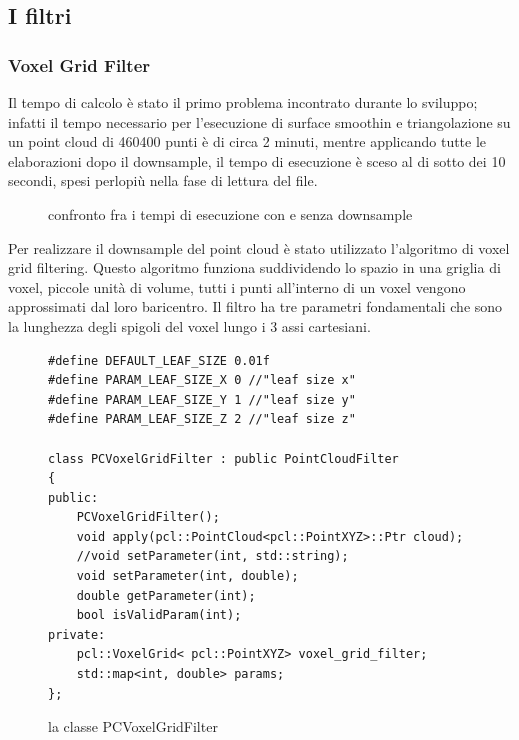 \documentclass[a4paper,12pt]{article}
\begin{document}
	\subsection{I filtri}
		\subsubsection{Voxel Grid Filter}
		Il tempo di calcolo è stato il primo problema incontrato durante lo sviluppo; infatti
		il tempo necessario per l'esecuzione di surface smoothin e triangolazione su un point cloud di 460400 punti è
		di circa 2 minuti, mentre applicando tutte le elaborazioni dopo il downsample,
		il tempo di esecuzione è sceso al di sotto dei 10 secondi, spesi perlopiù nella fase di lettura del file.
		\begin{figure}[H]
    	\centering
    	\caption{confronto fra i tempi di esecuzione con e senza downsample}
    	\label{fig:time_comparison}
		\end{figure}		
		Per realizzare il downsample del point cloud è stato utilizzato l'algoritmo di voxel grid filtering.
		Questo algoritmo funziona suddividendo lo spazio in una griglia di voxel, piccole unità di volume, tutti i punti
		all'interno di un voxel vengono approssimati dal loro baricentro.
		Il filtro ha tre parametri fondamentali che sono la lunghezza degli spigoli del voxel lungo i 3 assi cartesiani.
		\begin{figure}[H]
		\begin{lstlisting}
#define DEFAULT_LEAF_SIZE 0.01f
#define PARAM_LEAF_SIZE_X 0 //"leaf size x"
#define PARAM_LEAF_SIZE_Y 1 //"leaf size y"
#define PARAM_LEAF_SIZE_Z 2 //"leaf size z"

class PCVoxelGridFilter : public PointCloudFilter
{
public:
    PCVoxelGridFilter();
    void apply(pcl::PointCloud<pcl::PointXYZ>::Ptr cloud);
    //void setParameter(int, std::string);
    void setParameter(int, double);
    double getParameter(int);
    bool isValidParam(int);
private:
    pcl::VoxelGrid< pcl::PointXYZ> voxel_grid_filter;
    std::map<int, double> params;
};
		\end{lstlisting}
		\caption{la classe PCVoxelGridFilter}
		\label{pcvoxelgridfilter}		
		\end{figure}	
\end{document}
